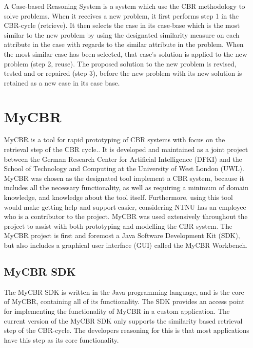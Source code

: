 A Case-based Reasoning System is a system which use the CBR methodology to solve problems. When it receives a new problem, it first performs step 1 in the CBR-cycle (retrieve). It then selects the case in its case-base which is the most similar to the new problem by using the designated similarity measure on each attribute in the case with regards to the similar attribute in the problem. When the most similar case has been selected, that case's solution is applied to the new problem (step 2, reuse). The proposed solution to the new problem is revised, tested and or repaired (step 3), before the new problem with its new solution is retained as a new case in its case base.

\section{MyCBR}

MyCBR is a tool for rapid prototyping of CBR systems with focus on the retrieval step of the CBR cycle.\cite{MyCBR}. It is developed and maintained as a joint project between the German Research Center for Artificial Intelligence (DFKI) and the School of Technology and Computing at the University of West London (UWL)\cite{Stahl2008}. MyCBR was chosen as the designated tool implement a CBR system, because it includes all the necessary functionality, as well as requiring a minimum of domain knowledge, and knowledge about the tool itself. Furthermore, using this tool would make getting help and support easier, considering NTNU has an employee who is a contributor to the project. MyCBR was used extensively throughout the project to assist with both prototyping and modelling the CBR system. The MyCBR project is first and foremost a Java Software Development Kit (SDK), but also includes a graphical user interface (GUI) called the MyCBR Workbench. 

\subsection{MyCBR SDK}
The MyCBR SDK is written in the Java programming language, and is the core of MyCBR, containing all of its functionality. The SDK provides an access point for implementing the functionality of MyCBR in a custom application. The current version of the MyCBR SDK only supports the similarity based retrieval step of the CBR-cycle. The developers reasoning for this is that most applications have this step as its core functionality\cite{Stahl2008}.  

